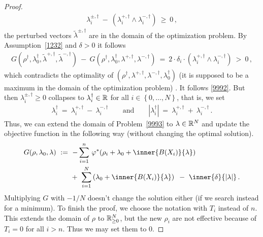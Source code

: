\begin{proof}
\begin{gather*}
      \lambda_i^{\pm,\dagger}
      \!
      \ 
      -
      \ 
      (
      \lambda_i^{+,\dagger}
      \!
      \land
      \lambda_i^{-,\dagger}
      )
      \ 
      \ge 
      \ 
      0
      \,,
  \end{gather*}
  the perturbed vectors $\tilde{\lambda}^{\pm,\dagger}$ are  in the domain of the 
  optimization problem.
  By Assumption~\eqref{1232} and $\delta>0$ it follows
  \begin{align*}
  G
  \left( 
  \rho^\dagger,\lambda_0^\dagger,\tilde{\lambda}^{+,\dagger},\tilde{\lambda}^{-,\dagger}
  \right)
  \ 
  -
  \ 
  G
  \left( 
  \rho^\dagger,\lambda_0^\dagger,\lambda^{+,\dagger},\lambda^{-,\dagger}
  \right)
  \ 
  =
  \ 
  2
  \cdot
  \delta_i
  \cdot
      (
      \lambda_i^{+,\dagger}
      \!
      \land
      \lambda_i^{-,\dagger}
      )
  \ 
  >
  \ 
  0
  \,,
  \end{align*}
  which contradicts the optimality of
$
  (\rho^\dagger,\lambda^{+,\dagger},\lambda^{-,\dagger},\lambda_0^\dagger)
$
(it is supposed to be a maximum in the domain of the optimization problem)
.
It follows \eqref{9992}.
But then 
$
\lambda^{\pm,\dagger}_i
\ge 0
$
collapses to
$
\lambda_i^\dagger\in \mathbb{R}
$ 
for all
$i\in \left\{ 0,\ldots,N \right\}$, that is, we set
\begin{gather*}
 \lambda_i^\dagger
 \ 
 =
 \ 
 \lambda_i^{+,\dagger}
 \ 
 -
 \ 
 \lambda_i^{-,\dagger}
 \qquad
 \text{and}
 \qquad
|\lambda_i^\dagger|
\ 
=
\ 
\lambda_i^{+,\dagger}
\ 
+
\ 
\lambda_i^{-,\dagger}
\,.
\end{gather*}
Thus, we can extend the domain of Problem~\ref{9993} to $\lambda\in\mathbb{R}^{N}$ and update the objective function in the following way
(without changing the optimal solution).
\begin{align*}
  G
  (\rho,\lambda_0,\lambda)
  &
  \ 
  :=
  \ 
 -
\sum_{i=1} 
  ^n
    \,
  \varphi^*
  \!
  \left( 
    \rho_i
    +
\lambda_0
+
\inner
{B(X_i)}
{
\lambda
}
  \right)
  \\
  &
  \qquad
+
\ 
\sum_{i=1}^{N} 
  \left( 
\lambda_0
+
\inner
{B(X_i)}
{
\lambda
}
  \right)
  \,
  \ 
-
\ 
\inner
{\delta}
{
  |\lambda|
}
  \,.
\end{align*}
Multiplying $G$ with $-1/N$ doesn't change the solution either
(if we search instead for a minimum).
To finish the proof, we choose the notation with $T_i$ instead of $n$. This extends the domain of $\rho$ to $\mathbb{R}^N_{\ge 0}$, but the 
new $\rho_i$ are not effective because of $T_i=0$ for all $i>n$. 
Thus we may set them to 0.
\end{proof}
